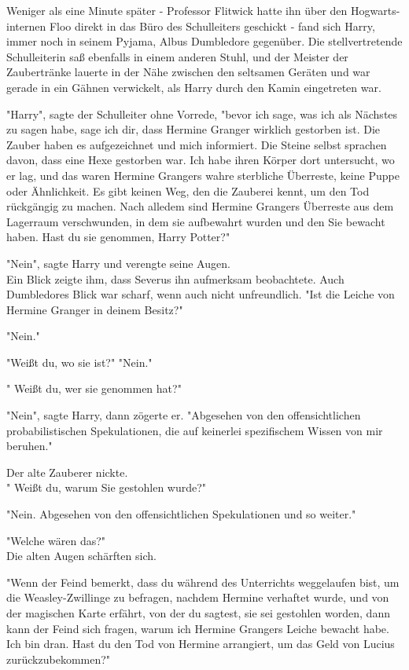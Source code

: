 {Weniger als eine Minute später - Professor Flitwick hatte ihn über den Hogwarts-internen Floo direkt in das Büro des Schulleiters geschickt - fand sich Harry, immer noch in seinem Pyjama, Albus Dumbledore gegenüber. Die stellvertretende Schulleiterin saß ebenfalls in einem anderen Stuhl, und der Meister der Zaubertränke lauerte in der Nähe zwischen den seltsamen Geräten und war gerade in ein Gähnen verwickelt, als Harry durch den Kamin eingetreten war.

"Harry", sagte der Schulleiter ohne Vorrede, "bevor ich sage, was ich als Nächstes zu sagen habe, sage ich dir, dass Hermine Granger wirklich gestorben ist. Die Zauber haben es aufgezeichnet und mich informiert. Die Steine selbst sprachen davon, dass eine Hexe gestorben war. Ich habe ihren Körper dort untersucht, wo er lag, und das waren Hermine Grangers wahre sterbliche Überreste, keine Puppe oder Ähnlichkeit. Es gibt keinen Weg, den die Zauberei kennt, um den Tod rückgängig zu machen. Nach alledem sind Hermine Grangers Überreste aus dem Lagerraum verschwunden, in dem sie aufbewahrt wurden und den Sie bewacht haben. Hast du sie genommen, Harry Potter?"

"Nein", sagte Harry und verengte seine Augen.\\ Ein Blick zeigte ihm, dass Severus ihn aufmerksam beobachtete. Auch Dumbledores Blick war scharf, wenn auch nicht unfreundlich. "Ist die Leiche von Hermine Granger in deinem Besitz?"

"Nein."

"Weißt du, wo sie ist?" "Nein."

" Weißt du, wer sie genommen hat?"

"Nein", sagte Harry, dann zögerte er. "Abgesehen von den offensichtlichen probabilistischen Spekulationen, die auf keinerlei spezifischem Wissen von mir beruhen."

Der alte Zauberer nickte.\\ " Weißt du, warum Sie gestohlen wurde?"

"Nein. Abgesehen von den offensichtlichen Spekulationen und so weiter."

"Welche wären das?"\\ Die alten Augen schärften sich.

"Wenn der Feind bemerkt, dass du während des Unterrichts weggelaufen bist, um die Weasley-Zwillinge zu befragen, nachdem Hermine verhaftet wurde, und von der magischen Karte erfährt, von der du sagtest, sie sei gestohlen worden, dann kann der Feind sich fragen, warum ich Hermine Grangers Leiche bewacht habe. Ich bin dran. Hast du den Tod von Hermine arrangiert, um das Geld von Lucius zurückzubekommen?"

}
